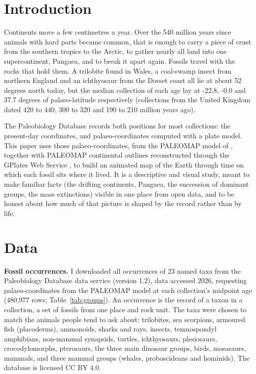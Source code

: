 \documentclass[11pt,a4paper]{article}
\begin{document}
\section{Introduction}
Continents move a few centimetres a year. Over the 540 million years since animals with hard parts became common, that is enough to carry a piece of crust from the southern tropics to the Arctic, to gather nearly all land into one supercontinent, Pangaea, and to break it apart again. Fossils travel with the rocks that hold them. A trilobite found in Wales, a coal-swamp insect from northern England and an ichthyosaur from the Dorset coast all lie at about 52 degrees north today, but the median collection of each age lay at -22.8, -0.0 and 37.7 degrees of palaeo-latitude respectively (collections from the United Kingdom dated 420 to 440, 300 to 320 and 190 to 210 million years ago).

The Paleobiology Database \citep{peters2016} records both positions for most collections: the present-day coordinates, and palaeo-coordinates computed with a plate model. This paper uses those palaeo-coordinates, from the PALEOMAP model of \citet{scotese2016}, together with PALEOMAP continental outlines reconstructed through the GPlates Web Service \citep{muller2018}, to build an animated map of the Earth through time on which each fossil sits where it lived. It is a descriptive and visual study, meant to make familiar facts (the drifting continents, Pangaea, the succession of dominant groups, the mass extinctions) visible in one place from open data, and to be honest about how much of that picture is shaped by the record rather than by life.

\section{Data}
\textbf{Fossil occurrences.} I downloaded all occurrences of 23 named taxa from the Paleobiology Database data service (version 1.2), data accessed 2026, requesting palaeo-coordinates from the PALEOMAP model at each collection's midpoint age (480,977 rows; Table~\ref{tab:groups}). An occurrence is the record of a taxon in a collection, a set of fossils from one place and rock unit. The taxa were chosen to match the animals people tend to ask about: trilobites, sea scorpions, armoured fish (placoderms), ammonoids, sharks and rays, insects, temnospondyl amphibians, non-mammal synapsids, turtles, ichthyosaurs, plesiosaurs, crocodylomorphs, pterosaurs, the three main dinosaur groups, birds, mosasaurs, mammals, and three mammal groups (whales, proboscideans and hominids). The database is licensed CC BY 4.0.
\end{document}
